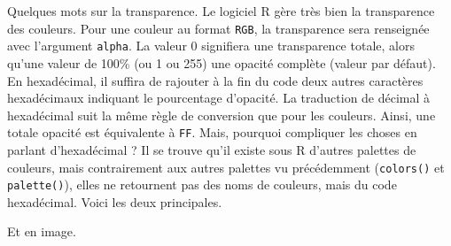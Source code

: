 \documentclass[]{article}
\newenvironment{Shaded}{\begin{snugshade}}{\end{snugshade}}
\newcommand{\CommentTok}[1]{\textcolor[rgb]{0.56,0.35,0.01}{\textit{#1}}}
\newcommand{\DataTypeTok}[1]{\textcolor[rgb]{0.13,0.29,0.53}{#1}}
\newcommand{\DecValTok}[1]{\textcolor[rgb]{0.00,0.00,0.81}{#1}}
\newcommand{\KeywordTok}[1]{\textcolor[rgb]{0.13,0.29,0.53}{\textbf{#1}}}
\newcommand{\NormalTok}[1]{#1}
\begin{document}
Quelques mots sur la transparence. Le logiciel R gère très bien la transparence des couleurs. Pour une couleur au format \texttt{RGB}, la transparence sera renseignée avec l'argument \texttt{alpha}. La valeur 0 signifiera une transparence totale, alors qu'une valeur de 100\% (ou 1 ou 255) une opacité complète (valeur par défaut). En hexadécimal, il suffira de rajouter à la fin du code deux autres caractères hexadécimaux indiquant le pourcentage d'opacité. La traduction de décimal à hexadécimal suit la même règle de conversion que pour les couleurs. Ainsi, une totale opacité est équivalente à \texttt{FF}.
Mais, pourquoi compliquer les choses en parlant d'hexadécimal ? Il se trouve qu'il existe sous R d'autres palettes de couleurs, mais contrairement aux autres palettes vu précédemment (\texttt{colors()} et \texttt{palette()}), elles ne retournent pas des noms de couleurs, mais du code hexadécimal. Voici les deux principales.

\begin{Shaded}
\end{Shaded}

Et en image.
\end{document}
